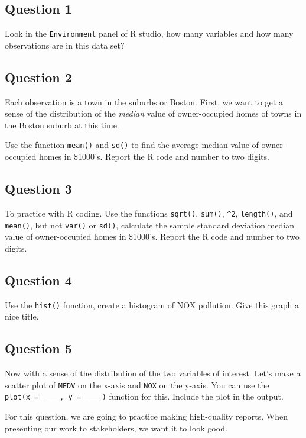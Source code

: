 \documentclass[12pt]{article}
\begin{document}
\subsection*{Question 1}

Look in the \texttt{Environment} panel of R studio, how many variables
and how many observations are in this data set?

\subsection*{Question 2}

Each observation is a town in the suburbs or Boston. First, we want to
get a sense of the distribution of the \emph{median} value of
owner-occupied homes of towns in the Boston suburb at this time.

Use the function \texttt{mean()} and \texttt{sd()} to find the average
median value of owner-occupied homes in \$1000's. Report the R code and
number to two digits.

\subsection*{Question 3}

To practice with R coding. Use the functions \texttt{sqrt()},
\texttt{sum()}, \texttt{\^{}2}, \texttt{length()}, and \texttt{mean()},
but not \texttt{var()} or \texttt{sd()}, calculate the sample standard
deviation median value of owner-occupied homes in \$1000's. Report the R
code and number to two digits.

\subsection*{Question 4}

Use the \texttt{hist()} function, create a histogram of NOX pollution.
Give this graph a nice title.

\subsection*{Question 5}

Now with a sense of the distribution of the two variables of interest.
Let's make a scatter plot of \texttt{MEDV} on the x-axis and
\texttt{NOX} on the y-axis. You can use the
\texttt{plot(x\ =\ \_\_\_\_,\ y\ =\ \_\_\_\_)} function for this.
Include the plot in the output.

For this question, we are going to practice making high-quality reports.
When presenting our work to stakeholders, we want it to look good.
\end{document}
